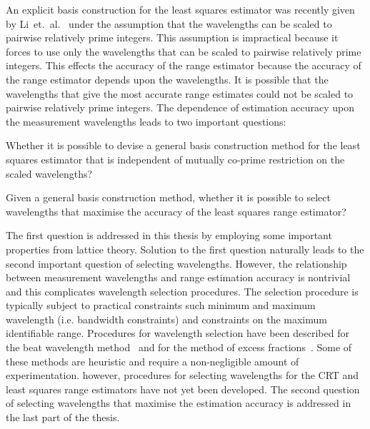 An explicit basis construction for the least squares estimator was recently given by Li~et.~al.~\cite{Li_distance_est_wrapped_phase} under the assumption that the wavelengths can be scaled to pairwise relatively prime integers. This assumption is impractical because it forces to use only the wavelengths that can be scaled to pairwise relatively prime integers. %
This effects the accuracy of the range estimator because the accuracy of the range estimator depends upon the wavelengths. It is possible that the wavelengths that give the most accurate range estimates could not be scaled to pairwise relatively prime integers. The dependence of estimation accuracy upon the measurement wavelengths leads to two important questions:
\begin{itemise}
\item{Whether it is possible to devise a general basis construction method for the least squares estimator that is independent of mutually co-prime restriction on the scaled wavelengths?}
\item{Given a general basis construction method, whether it is possible to select wavelengths that maximise the accuracy of the least squares range estimator?}
\end{itemise}
The first question is addressed in this thesis by employing some important properties from lattice theory. Solution to the first question naturally leads to the second important question of selecting wavelengths.
However, the relationship between measurement wavelengths and range estimation accuracy is nontrivial and this complicates wavelength selection procedures. The selection procedure is typically subject to practical constraints such minimum and maximum wavelength (i.e. bandwidth constraints) and constraints on the maximum identifiable range. Procedures for wavelength selection have been described for the beat wavelength method~\cite{Towers_frequency_selection_interferometry_2003} and for the method of excess fractions~\cite{Falaggis_excess_fractions_2012}.  Some of these methods are heuristic and require a non-negligible amount of experimentation.  however, procedures for selecting wavelengths for the CRT and least squares range estimators have not yet been developed. The second question of selecting wavelengths that maximise the estimation accuracy is addressed in the last part of the thesis.


